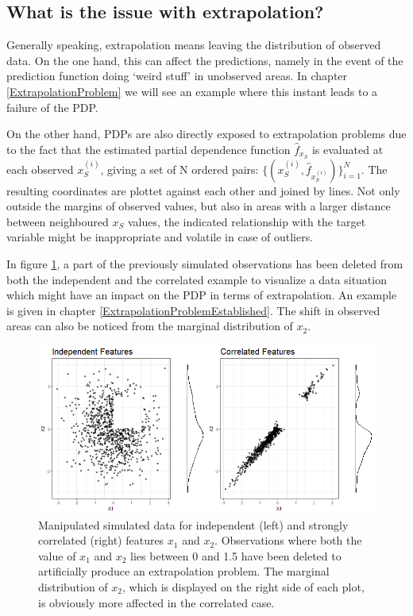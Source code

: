 \documentclass[
]{krantz}
\begin{document}
\hypertarget{what-is-the-issue-with-extrapolation}{%
\subsection{What is the issue with extrapolation?}\label{what-is-the-issue-with-extrapolation}}

Generally speaking, extrapolation means leaving the distribution of observed data. On the one hand, this can affect the predictions, namely in the event of the prediction function doing `weird stuff' in unobserved areas. In chapter \ref{ExtrapolationProblem} we will see an example where this instant leads to a failure of the PDP.\citep{molnar2019}

On the other hand, PDPs are also directly exposed to extrapolation problems due to the fact that the estimated partial dependence function \(\hat{f}_{x_S}\) is evaluated at each observed \(x^{(i)}_{S}\), giving a set of N ordered pairs: \(\{(x^{(i)}_{S}, \hat{f}_{x^{(i)}_{S}})\}_{i=1}^N\). The resulting coordinates are plottet against each other and joined by lines. Not only outside the margins of observed values, but also in areas with a larger distance between neighboured \(x_S\) values, the indicated relationship with the target variable might be inappropriate and volatile in case of outliers.\citep{Goldstein2013}

In figure \ref{fig:Figure02}, a part of the previously simulated observations has been deleted from both the independent and the correlated example to visualize a data situation which might have an impact on the PDP in terms of extrapolation. An example is given in chapter \ref{ExtrapolationProblemEstablished}. The shift in observed areas can also be noticed from the marginal distribution of \(x_2\).

\begin{figure}
\includegraphics[width=1\linewidth]{images/VK_PDP_2_Data_ind_dep_gap} \caption{Manipulated simulated data for independent (left) and strongly correlated (right) features $x_1$ and $x_2$. Observations where both the value of $x_1$ and $x_2$ lies between 0 and 1.5 have been deleted to artificially produce an extrapolation problem. The marginal distribution of $x_2$, which is displayed on the right side of each plot, is obviously more affected in the correlated case.}\label{fig:Figure02}
\end{figure}
\end{document}
